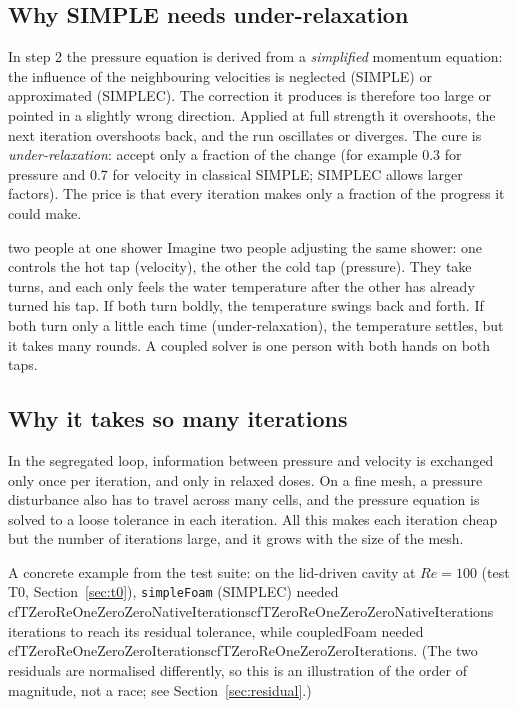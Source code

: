 \documentclass[11pt,a4paper]{article}
\newcommand{\cfpendingmark}{\fbox{\scriptsize pending}}
\newcommand{\cfnum}[1]{%
  \ifcsname cf#1\endcsname\csname cf#1\endcsname\else\cfpendingmark\fi}
\newcommand{\code}[1]{\texttt{#1}}
\begin{document}
\subsection{Why SIMPLE needs under-relaxation}

In step 2 the pressure equation is derived from a \emph{simplified}
momentum equation: the influence of the neighbouring velocities is
neglected (SIMPLE) or approximated (SIMPLEC). The correction it produces is
therefore too large or pointed in a slightly wrong direction. Applied at
full strength it overshoots, the next iteration overshoots back, and the
run oscillates or diverges. The cure is \emph{under-relaxation}: accept
only a fraction of the change (for example 0.3 for pressure and 0.7 for
velocity in classical SIMPLE; SIMPLEC allows larger factors). The price is
that every iteration makes only a fraction of the progress it could make.

\begin{intuition}{two people at one shower}
  Imagine two people adjusting the same shower: one controls the hot tap
  (velocity), the other the cold tap (pressure). They take turns, and each
  only feels the water temperature after the other has already turned his
  tap. If both turn boldly, the temperature swings back and forth. If both
  turn only a little each time (under-relaxation), the temperature settles,
  but it takes many rounds. A coupled solver is one person with both hands
  on both taps.
\end{intuition}

\subsection{Why it takes so many iterations}

In the segregated loop, information between pressure and velocity is
exchanged only once per iteration, and only in relaxed doses. On a fine
mesh, a pressure disturbance also has to travel across many cells, and the
pressure equation is solved to a loose tolerance in each iteration. All
this makes each iteration cheap but the number of iterations large, and it
grows with the size of the mesh.

A concrete example from the test suite: on the lid-driven cavity at $Re=100$
(test T0, Section~\ref{sec:t0}), \code{simpleFoam} (SIMPLEC) needed
\cfnum{TZeroReOneZeroZeroNativeIterations} iterations to reach its residual
tolerance, while coupledFoam needed \cfnum{TZeroReOneZeroZeroIterations}.
(The two residuals are normalised differently, so this is an illustration of
the order of magnitude, not a race; see Section~\ref{sec:residual}.)
\end{document}
